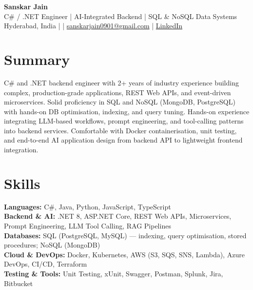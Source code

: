 \documentclass[10pt,letterpaper]{article}
\begin{document}
\begin{center}
    {\Large \textbf{Sanskar Jain}} \\
    C\# / .NET Engineer \;|\; AI-Integrated Backend \;|\; SQL \& NoSQL Data Systems \\
    Hyderabad, India \enspace |  \enspace | \enspace
    \href{mailto:sanskarjain0901@gmail.com}{sanskarjain0901@gmail.com} \enspace | \enspace
    \href{https://www.linkedin.com/in/sanskar-jain0901/}{LinkedIn}
\end{center}

\vspace{2pt}

\section*{Summary}
C\# and .NET backend engineer with 2+ years of industry experience building complex, production-grade applications, REST Web APIs, and event-driven microservices. Solid proficiency in SQL and NoSQL (MongoDB, PostgreSQL) with hands-on DB optimisation, indexing, and query tuning. Hands-on experience integrating LLM-based workflows, prompt engineering, and tool-calling patterns into backend services. Comfortable with Docker containerisation, unit testing, and end-to-end AI application design from backend API to lightweight frontend integration.

\section*{Skills}
\textbf{Languages:} C\#, Java, Python, JavaScript, TypeScript \\
\textbf{Backend \& AI:} .NET 8, ASP.NET Core, REST Web APIs, Microservices, Prompt Engineering, LLM Tool Calling, RAG Pipelines \\
\textbf{Databases:} SQL (PostgreSQL, MySQL) --- indexing, query optimisation, stored procedures; NoSQL (MongoDB) \\
\textbf{Cloud \& DevOps:} Docker, Kubernetes, AWS (S3, SQS, SNS, Lambda), Azure DevOps, CI/CD, Terraform \\
\textbf{Testing \& Tools:} Unit Testing, xUnit, Swagger, Postman, Splunk, Jira, Bitbucket
\end{document}
